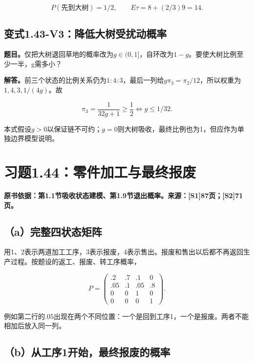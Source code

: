 \documentclass[
  11pt,
  a4paper,
  UTF8,
  fontset=fandol]{ctexart}
\begin{document}
\[
\boxed{P(\text{先到大树})=1/2,\qquad E\tau=8+(2/3)9=14.}
\]

\subsection{变式1.43-V3：降低大树受扰动概率}\label{ux53d8ux5f0f1.43-v3ux964dux4f4eux5927ux6811ux53d7ux6270ux52a8ux6982ux7387}

\textbf{题目。}仅把大树退回草地的概率改为\(g\in(0,1]\)，自环改为\(1-g\)。要使大树比例至少一半，g需多小？

\textbf{解答。}前三个状态的比例关系仍为\(1:4:3\)，最后一列给\(g\pi_3=\pi_2/12\)，所以权重为\(1,4,3,1/(4g)\)。故

\[
\pi_3=\frac{1}{32g+1}\ge\frac12
\iff\boxed{g\le1/32.}
\]

本式假设\(g>0\)以保证链不可约；\(g=0\)则大树吸收，最终比例也为1，但应作为单独边界模型说明。

\section{习题1.44：零件加工与最终报废}\label{ux4e60ux98981.44ux96f6ux4ef6ux52a0ux5de5ux4e0eux6700ux7ec8ux62a5ux5e9f}

\textbf{原书依据：第1.1节吸收状态建模、第1.9节退出概率。来源：{[}S1{]}87页；{[}S2{]}71页。}

\subsection{（a）完整四状态矩阵}\label{aux5b8cux6574ux56dbux72b6ux6001ux77e9ux9635}

用1、2表示两道加工工序，3表示报废，4表示售出。报废和售出以后都不再返回生产过程。按题设的返工、报废、转工序概率，

\[
\boxed{P=\begin{pmatrix}
.2&.7&.1&0\\.05&.1&.05&.8\\0&0&1&0\\0&0&0&1
\end{pmatrix}.}
\]

例如第二行的\(.05\)出现在两个不同位置：一个是回到工序1，一个是报废。两者不能相加后放入同一列。

\subsection{（b）从工序1开始，最终报废的概率}\label{bux4eceux5de5ux5e8f1ux5f00ux59cbux6700ux7ec8ux62a5ux5e9fux7684ux6982ux7387}
\end{document}
